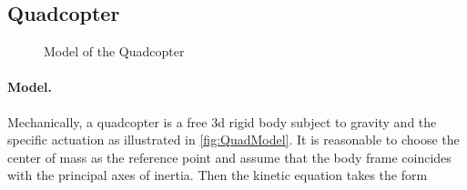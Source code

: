 \subsection{Quadcopter}\label{sec:CtrlExampleQuadcopter}

\begin{figure}[ht]
 \centering
 
 \caption{Model of the Quadcopter}
 \label{fig:QuadModel}
\end{figure}

\paragraph{Model.}
Mechanically, a quadcopter is a free 3d rigid body subject to gravity and the specific actuation as illustrated in \autoref{fig:QuadModel}.
It is reasonable to choose the center of mass as the reference point and assume that the body frame coincides with the principal axes of inertia.
Then the kinetic equation takes the form
